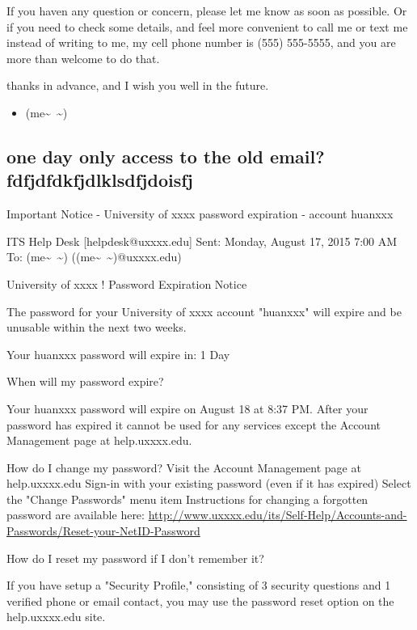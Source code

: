 \documentclass[9pt,b5paper]{article}
\begin{document}
If you haven any question or concern, please let me know as soon as possible. Or if you need to check some details, and feel more convenient to call me or text me instead of writing to me, my cell phone number is (555) 555-5555, and you are more than welcome to do that. 

thanks in advance, and I wish you well in the future. 

\begin{itemize}
\item (me\textasciitilde{}~\textasciitilde{})
\end{itemize}

\subsection{one day only access to the old email? fdfjdfdkfjdlklsdfjdoisfj}
\label{sec-7-10}

Important Notice - University of xxxx password expiration - account huanxxx

ITS Help Desk [helpdesk@uxxxx.edu]
Sent:        Monday, August 17, 2015 7:00 AM
To:        
(me\textasciitilde{}~\textasciitilde{}) ((me\textasciitilde{}~\textasciitilde{})@uxxxx.edu)


University of xxxx          !                   Password Expiration Notice         

The password for your University of xxxx account "huanxxx" will expire and be unusable within the next two weeks.

Your huanxxx password will expire in:
1 Day

When will my password expire?

Your huanxxx password will expire on August 18 at 8:37 PM. After your password has expired it cannot be used for any services except the Account Management page at help.uxxxx.edu.

How do I change my password?
Visit the Account Management page at help.uxxxx.edu
Sign-in with your existing password (even if it has expired)
Select the "Change Passwords" menu item
Instructions for changing a forgotten password are available here:
\url{http://www.uxxxx.edu/its/Self-Help/Accounts-and-Passwords/Reset-your-NetID-Password}

How do I reset my password if I don't remember it?

If you have setup a "Security Profile," consisting of 3 security questions and 1 verified phone or email contact, you may use the password reset option on the help.uxxxx.edu site.
\end{document}
